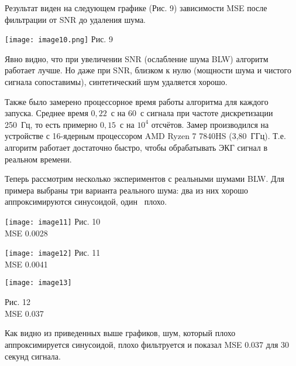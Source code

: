 \documentclass[10pt,a5paper]{article}
\numberwithin{figure}{section}
\numberwithin{table}{section}
\begin{document}
Результат виден на следующем графике (Рис. 9) зависимости MSE после фильтрации от SNR до удаления шума.

\noindent
\begin{minipage}{\textwidth}
	\centering
    \texttt{[image: image10.png]}
    \centering Рис. 9
    \label{fig:image10}
\end{minipage}
\medskip

Явно видно, что при увеличении SNR (ослабление шума BLW) алгоритм работает лучше. Но даже при SNR, близком к нулю (мощности шума и чистого сигнала сопоставимы), синтетический шум удаляется хорошо.

Также было замерено процессорное время работы алгоритма для каждого запуска. Среднее время $0{,}22$~с на 60~с сигнала при частоте дискретизации 250~Гц, то есть примерно $0{,}15$~с на $10^4$ отсчётов. Замер производился на устройстве с 16-ядерным процессором AMD Ryzen 7 7840HS (3{,}80~ГГц). Т.е. алгоритм работает достаточно быстро, чтобы обрабатывать ЭКГ сигнал в реальном времени.

Теперь рассмотрим несколько экспериментов с реальными шумами BLW. Для примера выбраны три варианта реального шума: два из них хорошо аппроксимируются синусоидой, один \textendash\ плохо.

\noindent
\begin{minipage}[t]{0.48\textwidth}
    \centering
    \texttt{[image: image11]}
    \centering Рис. 10\\MSE 0.0028
    \label{fig:image11}
\end{minipage}
\hfill
\begin{minipage}[t]{0.48\textwidth}
    \centering
    \texttt{[image: image12]}
    \centering Рис. 11\\MSE 0.0041
    \label{fig:image12}
\end{minipage}

\noindent
\begin{minipage}{\textwidth}
	\centering
    \texttt{[image: image13]}
    \par
    \centering Рис. 12\\MSE 0.037
    \label{fig:image13}
\end{minipage}
\medskip

\noindent
Как видно из приведенных выше графиков, шум, который плохо аппроксимируется синусоидой, плохо фильтруется и показал MSE 0.037 для 30 секунд сигнала.
\end{document}
